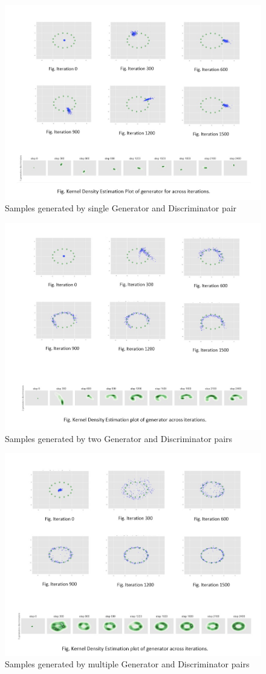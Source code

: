 \documentclass[12pt]{article}
\begin{document}
\begin{figure}[H]
	\centering
	\includegraphics[width=\linewidth]{1g1d.jpeg}
	\caption{Samples generated by single Generator and Discriminator pair}
	\label{fig:1g1d}
\end{figure}

\begin{figure}[H]
	\centering
	\includegraphics[width=0.75\linewidth]{2g2d.jpeg}
	\caption{Samples generated by two Generator and Discriminator pairs}
	\label{fig:2g2d}
\end{figure}

\begin{figure}[H]
	\centering
	\includegraphics[width=0.75\linewidth]{mgmd.jpeg}
	\caption{Samples generated by multiple Generator and Discriminator pairs}
	\label{fig:mgmd}
\end{figure}
\end{document}
